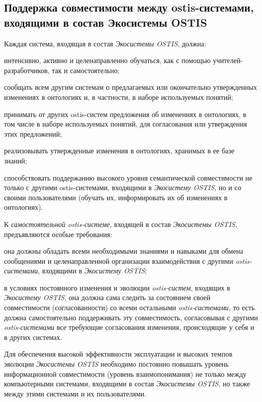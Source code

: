 \subsection{Поддержка совместимости между ostis-системами, входящими в состав Экосистемы OSTIS}
{\label{sec_ecosystem_interoperability_support}} 

Каждая система, входящая в состав \textit{Экосистемы OSTIS}, должна:
\begin{textitemize}
    \item интенсивно, активно и целенаправленно обучаться, как с помощью учителей-разработчиков, так и самостоятельно;
    \item сообщать всем другим системам о предлагаемых или окончательно утвержденных изменениях в онтологиях и, в частности, в наборе используемых понятий;
    \item принимать от других ostis-систем предложения об изменениях в онтологиях, в том числе в наборе используемых понятий, для согласования или утверждения этих предложений;
    \item реализовывать утвержденные изменения в онтологиях, хранимых в ее базе знаний;
    \item способствовать поддержанию высокого уровня семантической совместимости не только с другими ostis-системами, входящими в \textit{Экосистему OSTIS}, но и со своими пользователями (обучать их, информировать их об изменениях в онтологиях).
\end{textitemize}

К \textit{самостоятельной ostis-системе}, входящей в состав \textit{Экосистемы OSTIS}, предъявляются особые требования:
\begin{textitemize}
    \item она должны обладать всеми необходимыми знаниями и навыками для обмена сообщениями и целенаправленной организации взаимодействия с другими \textit{ostis-системами}, входящими в \textit{Экосистему OSTIS};
    \item в условиях постоянного изменения и эволюции \textit{ostis-систем}, входящих в \textit{Экосистему OSTIS}, она должна сама следить за состоянием своей совместимости (согласованности) со всеми остальными \textit{ostis-системами}, то есть должна самостоятельно поддерживать эту совместимость, согласовывая с другими \textit{ostis-системами} все требующие согласования изменения, происходящие у себя и в других системах.
\end{textitemize}

Для обеспечения высокой эффективности эксплуатации и высоких темпов эволюции \textit{Экосистемы OSTIS} необходимо постоянно повышать уровень информационной совместимости (уровень взаимопонимания) не только между компьютерными системами, входящими в состав \textit{Экосистемы OSTIS}, но также между этими системами и их пользователями. 

